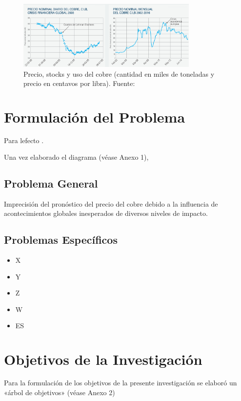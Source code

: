 \begin{figure}[h]
	\begin{center}
		\includegraphics[width=0.8\textwidth]{1/figures/precio_caidas_gustavo_lagos.png}
		\caption{Precio, stocks y uso del cobre (cantidad en miles de toneladas y precio en centavos por libra). Fuente: \cite{cu_lagos2017proyectar}}
		\label{1:fig4}
	\end{center}
\end{figure} 




\section{Formulación del Problema}

Para lefecto \parencite{ot_marti2018manual}. 


Una vez elaborado el diagrama (véase Anexo 1), 

\subsection{Problema General}
\newcommand{\ProblemaGeneral}{
	Imprecisión del pronóstico del precio del cobre debido a la influencia de acontecimientos globales inesperados de diversos niveles de impacto. 
}
\ProblemaGeneral
\subsection{Problemas Espec\'{i}ficos}
\newcommand{\Pbone}{
X
}
\newcommand{\Pbtwo}{
Y
}
\newcommand{\Pbthree}{
Z
}
\newcommand{\Pbfour}{
W
}
\newcommand{\Pbfive}{
	ES
}

\begin{itemize}
	\item \Pbone
	\item \Pbtwo
	\item \Pbthree
	\item \Pbfour
	\item \Pbfive
\end{itemize}

\section{Objetivos de la Investigación}
Para la formulación de los objetivos de la presente investigación se elaboró un «árbol de objetivos» (véase Anexo 2) 
